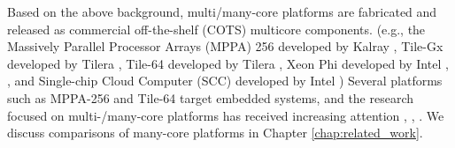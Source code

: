 


Based on the above background, multi/many-core platforms are fabricated and released as commercial off-the-shelf (COTS) multicore components.
(e.g., the Massively Parallel Processor Arrays (MPPA) 256 developed by Kalray \cite{de2013clustered} \cite{de2014time}, Tile-Gx developed by Tilera \cite{ramey2011tile} \cite{schooler2010tile}, Tile-64 developed by Tilera \cite{bell2008tile64}, Xeon Phi developed by Intel \cite{chrysos2014intel}, \cite{chrysos2012intel}, and Single-chip Cloud Computer (SCC) developed by Intel \cite{baron2010single})
Several platforms such as MPPA-256 and Tile-64 target embedded systems, and the research focused on multi-/many-core platforms has received increasing attention \cite{kanter2015kalray}, \cite{denet2017work}, \cite{perret2016predictable}.
We discuss comparisons of many-core platforms in Chapter \ref{chap:related_work}.

